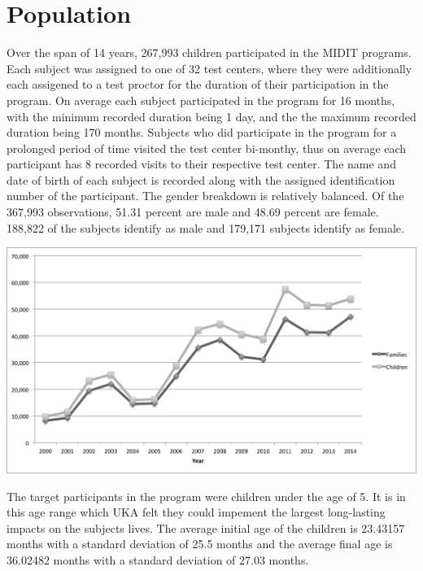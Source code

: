 \documentclass{article}
\begin{document}
\section{Population}
Over the span of 14 years, 267,993 children participated in the MIDIT programs. Each subject was assigned to one of 32 test centers, where they were additionally each assigened to a test proctor for the duration of their participation in the program. On average each subject participated in the program for 16 months, with the minimum recorded duration being 1 day, and the the maximum recorded duration being 170 months. Subjects who did participate in the program for a prolonged period of time visited the test center bi-monthy, thus on average each participant has 8 recorded visits to their respective test center. The name and date of birth of each subject is recorded along with the assigned identification number of the participant. The gender breakdown is relatively balanced. Of the 367,993 observations, 51.31 percent are male and 48.69 percent are female. 188,822 of the subjects identify as male and 179,171 subjects identify as female. 
\begin{center}
\includegraphics[scale=.5]{children.png}
\end{center}
The target participants in the program were children under the age of 5. It is in this age range which UKA felt they could impement the largest long-lasting impacts on the subjects lives. The average initial age of the children is 23.43157 months with a standard deviation of 25.5 months and the average final age is 36.02482 months with a standard deviation of 27.03 months.  
\end{document}
